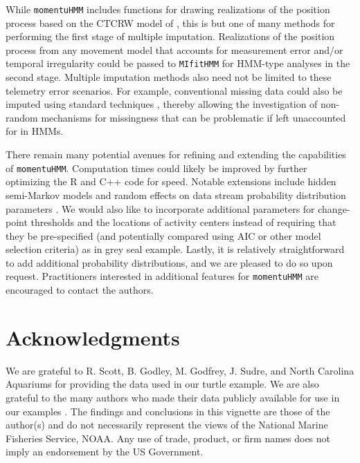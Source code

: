 \documentclass[12pt]{article}\usepackage[]{graphicx}\usepackage[]{xcolor}
\begin{document}
While \verb|momentuHMM| includes functions for drawing realizations of the position process based on the CTCRW model of \cite{JohnsonEtAl2008}, this is but one of many methods for performing the first stage of multiple imputation. Realizations of the position process from any movement model that accounts for measurement error and/or temporal irregularity \citep[e.g.][]{CalabreseEtAl2016,GurarieEtAl2017} could be passed to \verb|MIfitHMM| for HMM-type analyses in the second stage. Multiple imputation methods also need not be limited to these telemetry error scenarios. For example, conventional missing data could also be imputed using standard techniques \citep{RubinSchenker1986}, thereby allowing the investigation of non-random mechanisms for missingness that can be problematic if left unaccounted for in HMMs.

There remain many potential avenues for refining and extending the capabilities of \verb|momentuHMM|. Computation times could likely be improved by further optimizing the R and C++ code for speed. Notable extensions include hidden semi-Markov models and random effects on data stream probability distribution parameters \citep{ZucchiniEtAl2016}. We would also like to incorporate additional parameters for change-point thresholds and the locations of activity centers instead of requiring that they be pre-specified (and potentially compared using AIC or other model selection criteria) as in grey seal example. Lastly, it is relatively straightforward to add additional probability distributions, and we are pleased to do so upon request. Practitioners interested in additional features for \verb|momentuHMM| are encouraged to contact the authors.

\section*{Acknowledgments} 
We are grateful to R. Scott, B. Godley, M. Godfrey, J. Sudre, and North Carolina Aquariums for providing the data used in our turtle example. We are also grateful to the many authors who made their data publicly available for use in our examples \citep{WallEtAl2014,PirottaEtAl2018,IsojunnoEtAl2017,Leos-BarajasEtAl2017,AdamEtAl2019}. The findings and conclusions in this vignette are those of the author(s) and do not necessarily represent the views of the National Marine Fisheries Service, NOAA. Any use of trade, product, or firm names does not imply an endorsement by the US Government.




\clearpage
\end{document}
